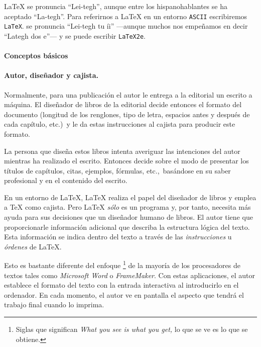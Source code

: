 \LaTeX{} se pronuncia ``Lei-tegh'',  aunque entre los hispanohablantes
se ha aceptado  ``La-tegh''. Para referirnos a \LaTeX{}  en un entorno
\texttt{ASCII}  escribiremos  \texttt{LaTeX}. \LaTeXe{}  se  pronuncia
``Lei-tegh tu  íi'' ---aunque muchos  nos empeñamos en  decir ``Lategh
dos e''--- y se puede escribir \texttt{LaTeX2e}.

\paragraph{Conceptos básicos}
 
\paragraph{Autor, diseñador y cajista.}

Normalmente, para una  publicación el autor le entrega  a la editorial
un escrito  a máquina. El diseñador  de libros de la  editorial decide
entonces el formato del documento  (longitud de los renglones, tipo de
letra, espacios antes y después de cada capítulo, etc.)\ y le da estas
instrucciones al cajista para producir este formato.

La persona que  diseña estos libros intenta  averiguar las intenciones
del autor mientras  ha realizado el escrito. Entonces  decide sobre el
modo de presentar los títulos de capítulos, citas, ejemplos, fórmulas,
etc.,\  basándose  en su  saber  profesional  y  en el  contenido  del
escrito.

En un  entorno de \LaTeX, \LaTeX{}  realiza el papel del  diseñador de
libros y emplea a \TeX{} como cajista. Pero \LaTeX{} \emph{sólo} es un
programa  y, por  tanto, necesita  más ayuda  para sus  decisiones que
un  diseñador humano  de  libros. El  autor  tiene que  proporcionarle
información  adicional que  describa la  estructura lógica  del texto.
Esta  información  se  indica  dentro   del  texto  a  través  de  las
\emph{instrucciones} u \emph{órdenes} de \LaTeX.

Esto  es bastante  diferente del  enfoque \footnote{Siglas
que significan \emph{What you see is what you get,} lo que se ve es lo
que  se  obtiene.}  de  la  mayoría  de  los  procesadores  de  textos
tales  como  \emph{Microsoft  Word}  o  \emph{FrameMaker}.  Con  estas
aplicaciones, el autor  establece el formato del texto  con la entrada
interactiva al introducirlo en el ordenador. En cada momento, el autor
ve  en pantalla  el  aspecto que  tendrá el  trabajo  final cuando  lo
imprima.

